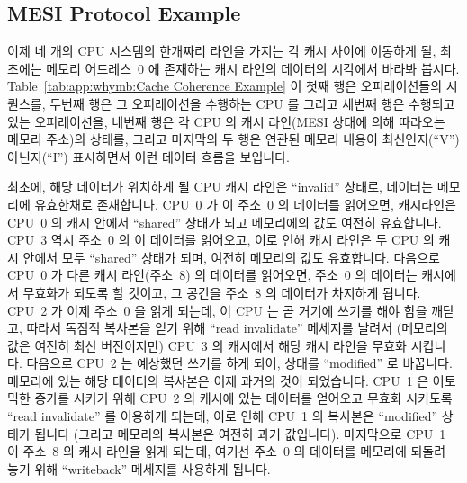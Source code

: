 \subsection{MESI Protocol Example}
\label{sec:app:whymb:MESI Protocol Example}

이제 네 개의 CPU 시스템의 한개짜리 라인을 가지는 각 캐시 사이에 이동하게 될,
최초에는 메모리 어드레스~0 에 존재하는 캐시 라인의 데이터의 시각에서 바라봐
봅시다.
Table~\ref{tab:app:whymb:Cache Coherence Example} 이 첫째 행은 오퍼레이션들의
시퀀스를, 두번째 행은 그 오퍼레이션을 수행하는 CPU 를 그리고 세번째 행은
수행되고 있는 오퍼레이션을, 네번째 행은 각 CPU 의 캐시 라인(MESI 상태에 의해
따라오는 메모리 주소)의 상태를, 그리고 마지막의 두 행은 연관된 메모리 내용이
최신인지(``V'') 아닌지(``I'') 표시하면서 이런 데이터 흐름을 보입니다.

최초에, 해당 데이터가 위치하게 될 CPU 캐시 라인은 ``invalid'' 상태로, 데이터는
메모리에 유효한채로 존재합니다.
CPU~0 가 이 주소~0 의 데이터를 읽어오면, 캐시라인은 CPU~0 의 캐시 안에서
``shared'' 상태가 되고 메모리에의 값도 여전히 유효합니다.
CPU~3 역시 주소~0 의 이 데이터를 읽어오고, 이로 인해 캐시 라인은 두 CPU 의 캐시
안에서 모두 ``shared'' 상태가 되며, 여전히 메모리의 값도 유효합니다.
다음으로 CPU~0 가 다른 캐시 라인(주소~8) 의 데이터를 읽어오면, 주소~0 의
데이터는 캐시에서 무효화가 되도록 할 것이고, 그 공간을 주소~8 의 데이터가
차지하게 됩니다.
CPU~2 가 이제 주소~0 을 읽게 되는데, 이 CPU 는 곧 거기에 쓰기를 해야 함을
깨닫고, 따라서 독점적 복사본을 얻기 위해 ``read invalidate'' 메세지를 날려서
(메모리의 값은 여전히 최신 버전이지만) CPU~3 의 캐시에서 해당 캐시 라인을
무효화 시킵니다.
다음으로 CPU~2 는 예상했던 쓰기를 하게 되어, 상태를 ``modified'' 로 바꿉니다.
메모리에 있는 해당 데이터의 복사본은 이제 과거의 것이 되었습니다.
CPU~1 은 어토믹한 증가를 시키기 위해 CPU~2 의 캐시에 있는 데이터를 얻어오고
무효화 시키도록 ``read invalidate'' 를 이용하게 되는데, 이로 인해 CPU~1 의
복사본은 ``modified'' 상태가 됩니다 (그리고 메모리의 복사본은 여전히 과거
값입니다).
마지막으로 CPU~1 이 주소~8 의 캐시 라인을 읽게 되는데, 여기선 주소~0 의
데이터를 메모리에 되돌려 놓기 위해 ``writeback'' 메세지를 사용하게 됩니다.
\iffalse

